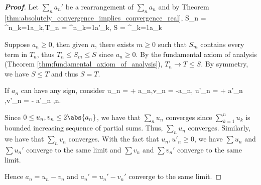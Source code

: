 


\begin{proof}[{\bf Proof}]
Let $\sum_n a_n'$ be a rearrangement of $\sum_n a_n$ and by Theorem \ref{thm:absolutely_convergence_implies_convergence_real},
\be
S_n = \sum^n_{k=1}a_k,\qquad T_n = \sum^n_{k=1}a'_k, \qquad S = \sum^\infty_{k=1}a_k
\ee

Suppose $a_n\geq 0$, then given $n$, there exists $m\geq 0$ such that $S_m$ contains every term in $T_n$, thus $T_n \leq S_m \leq S$ since $a_n\geq 0$. By the fundamental axiom of analysis (Theorem \ref{thm:fundamental_axiom_of_analysis}), $T_n\to T\leq S$. By symmetry, we have $S\leq T$ and thus $S=T$.

If $a_n$ can have any sign, consider
\be
u_n =  + a_n,\quad v_n =   -a_n, \quad u'_n =  + a'_n ,\quad v'_n =  - a'_n ,\qquad n\in \N.
\ee

Since $0\leq u_n,v_n \leq 2\abs{a_n}$, we have that $\sum_n u_n$ converges since $\sum^n_{k=1} u_k$ is bounded increasing sequence of partial sums. Thus, $\sum_n u_n$ converges. Similarly, we have that $\sum_n v_n$ converges. With the fact that $u_n,u'_n\geq 0$, we have $\sum u_n$ and $\sum u_n'$ converge to the same limit and $\sum v_n$ and $\sum v_n'$ converge to the same limit.

Hence $a_n = u_n - v_n$ and $a_n' = u_n' - v_n'$ converge to the same limit.
\end{proof}

%



